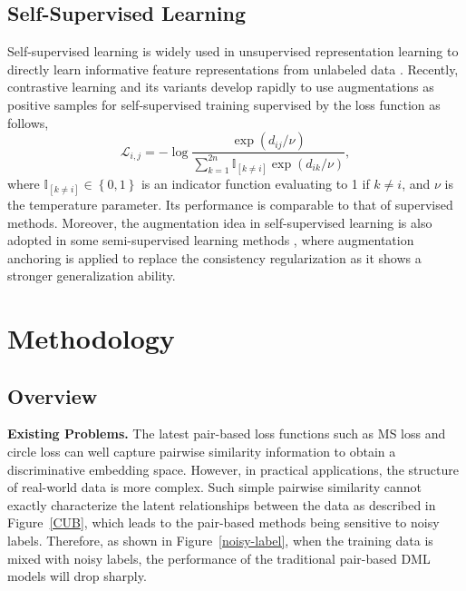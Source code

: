 \documentclass[lettersize,journal]{IEEEtran}
\begin{document}
\subsection{Self-Supervised Learning}
Self-supervised learning is widely used in unsupervised representation learning to directly  learn informative feature representations from unlabeled data \cite{caron2018deep,zhang2019aet}. Recently, contrastive learning and its variants \cite{oord2018representation,chen2020simple,khosla2020supervised,chen2020improved} develop rapidly to use augmentations as positive samples for self-supervised training supervised by the loss function as follows,
\begin{equation}
	\mathcal{L}_{i,j} = -\log \frac{\exp(d_{ij}/\nu) }{\sum^{2n}_{k= 1} \mathbb{I}_{[k \neq i]} \exp(d_{ik}/\nu)},
\end{equation}
where $\mathbb{I}_{[k \neq i]} \in \left\lbrace 0,1 \right\rbrace $ is an indicator function evaluating to 1 if $k \neq i$, and $\nu$ is the temperature parameter.
Its performance is comparable to that of supervised methods. Moreover, the augmentation idea in self-supervised learning is also adopted in some semi-supervised learning methods \cite{berthelot2019remixmatch,sohn2020fixmatch}, where  augmentation anchoring is applied to replace the consistency regularization as it shows a stronger generalization ability.


\section{Methodology}

\label{Method}

\subsection{Overview}
\textbf{Existing Problems.} %
The latest pair-based loss functions such as MS loss \cite{wang2019multi} and circle loss \cite{sun2020circle} can well capture pairwise similarity information to obtain a discriminative embedding space. 
However, in practical applications, the structure of  real-world data is more complex.  Such simple pairwise similarity cannot exactly characterize the latent relationships between the data as described in Figure~\ref{CUB}, which leads to the  pair-based methods being sensitive to noisy labels. Therefore, as shown in Figure~\ref{noisy-label}, when the training data is mixed with noisy labels, the performance of the traditional pair-based DML models will drop sharply.
\end{document}
